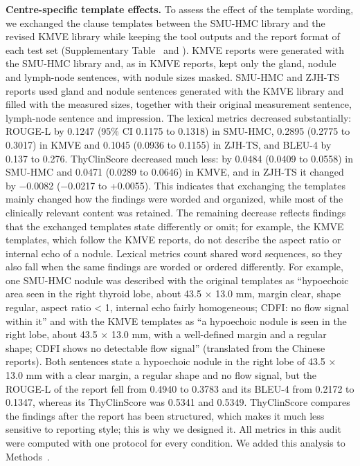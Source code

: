 \textbf{Centre-specific template effects.} To assess the effect of the template wording, we exchanged the clause templates between the SMU-HMC library and the revised KMVE library while keeping the tool outputs and the report format of each test set (Supplementary Table~\SuppTabSwap{} and ). KMVE reports were generated with the SMU-HMC library and, as in KMVE reports, kept only the gland, nodule and lymph-node sentences, with nodule sizes masked. SMU-HMC and ZJH-TS reports used gland and nodule sentences generated with the KMVE library and filled with the measured sizes, together with their original measurement sentence, lymph-node sentence and impression. The lexical metrics decreased substantially: ROUGE-L by 0.1247 (95\% CI 0.1175 to 0.1318) in SMU-HMC, 0.2895 (0.2775 to 0.3017) in KMVE and 0.1045 (0.0936 to 0.1155) in ZJH-TS, and BLEU-4 by 0.137 to 0.276. ThyClinScore decreased much less: by 0.0484 (0.0409 to 0.0558) in SMU-HMC and 0.0471 (0.0289 to 0.0646) in KMVE, and in ZJH-TS it changed by $-$0.0082 ($-$0.0217 to +0.0055). This indicates that exchanging the templates mainly changed how the findings were worded and organized, while most of the clinically relevant content was retained. The remaining decrease reflects findings that the exchanged templates state differently or omit; for example, the KMVE templates, which follow the KMVE reports, do not describe the aspect ratio or internal echo of a nodule. Lexical metrics count shared word sequences, so they also fall when the same findings are worded or ordered differently. For example, one SMU-HMC nodule was described with the original templates as ``hypoechoic area seen in the right thyroid lobe, about 43.5 $\times$ 13.0 mm, margin clear, shape regular, aspect ratio < 1, internal echo fairly homogeneous; CDFI: no flow signal within it'' and with the KMVE templates as ``a hypoechoic nodule is seen in the right lobe, about 43.5 $\times$ 13.0 mm, with a well-defined margin and a regular shape; CDFI shows no detectable flow signal'' (translated from the Chinese reports). Both sentences state a hypoechoic nodule in the right lobe of 43.5 $\times$ 13.0 mm with a clear margin, a regular shape and no flow signal, but the ROUGE-L of the report fell from 0.4940 to 0.3783 and its BLEU-4 from 0.2172 to 0.1347, whereas its ThyClinScore was 0.5341 and 0.5349. ThyClinScore compares the findings after the report has been structured, which makes it much less sensitive to reporting style; this is why we designed it. All metrics in this audit were computed with one protocol for every condition. We added this analysis to Methods~\SecMethReport{}.\par
